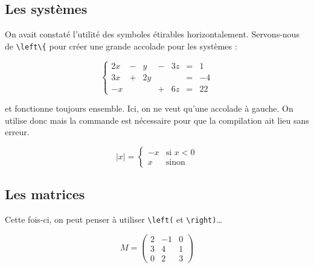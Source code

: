 \documentclass[10pt,french,openright,twoside]{book}
\begin{document}
\subsection{Les systèmes}

On avait constaté l'utilité des symboles étirables horizontalement. Servons-nous de \verb!\left\{! pour créer une grande accolade pour les systèmes :\bigskip

{\NewFont
\begin{SideBySideExample}
    \[\left\{
    	\begin{array}{ccccccl}
    		2x & - & y & - & 3z & = & 1 \\
    		3x & + & 2y &  &  & = & -4 \\
    		-x &  &  & + & 6z & = & 22
    	\end{array}
    \right.\]
\end{SideBySideExample}
}\bigskip

\begin{info}
     et  fonctionne toujours ensemble. Ici, on ne veut qu'une accolade à gauche. On utilise donc  mais la commande  est nécessaire pour que la compilation ait lieu sans erreur.
\end{info}

{\NewFont
\begin{SideBySideExample}
    \[\lvert x \rvert =
    \left\{
    	\begin{array}{cl}
    		-x & \text{si } x < 0 \\
    		x & \text{sinon}
    	\end{array}
    \right.\]
\end{SideBySideExample}
}\bigskip

\subsection{Les matrices}

Cette fois-ci, on peut penser à utiliser \verb!\left(! et \verb!\right)!\dots\bigskip

{\NewFont
\begin{SideBySideExample}
    \[M = \left(
    	\begin{array}{ccc}
    		2 & -1 & 0 \\
            3 & 4 & 1 \\
            0 & 2 & 3
    	\end{array}
    \right)\]
\end{SideBySideExample}
}\bigskip
\end{document}
